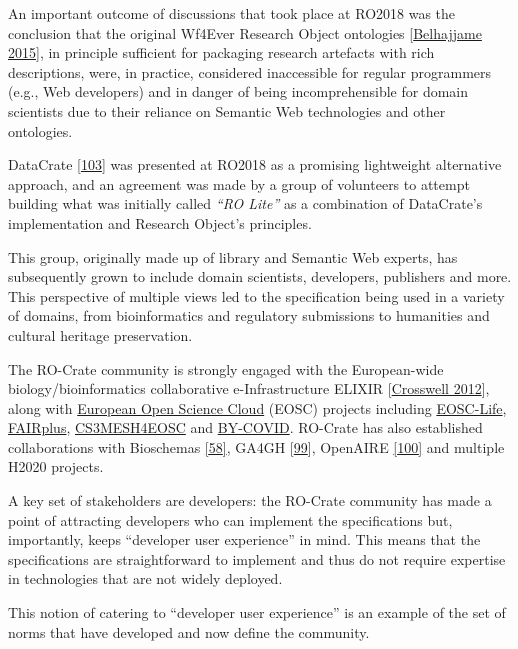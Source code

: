 An important outcome of discussions that took place at RO2018 was the
conclusion that the original Wf4Ever Research Object ontologies
{[}\href{https://doi.org/10.1016/j.websem.2015.01.003}{Belhajjame 2015}{]}, in
principle sufficient for packaging research artefacts with rich
descriptions, were, in practice, considered inaccessible for regular
programmers (e.g., Web developers) and in danger of being
incomprehensible for domain scientists due to their reliance on Semantic
Web technologies and other ontologies.

DataCrate {[}\href{https://doi.org/10.5281/zenodo.1445817}{103}{]} was
presented at RO2018 as a promising lightweight alternative approach, and
an agreement was made by a group of volunteers to attempt building what
was initially called \emph{``RO Lite''} as a combination of DataCrate's
implementation and Research Object's principles.

This group, originally made up of library and Semantic Web experts, has
subsequently grown to include domain scientists, developers, publishers
and more. This perspective of multiple views led to the specification
being used in a variety of domains, from bioinformatics and regulatory
submissions to humanities and cultural heritage preservation.

The RO-Crate community is strongly engaged with the European-wide
biology/bioinformatics collaborative e-Infrastructure ELIXIR
{[}\href{https://doi.org/10.1016/j.tibtech.2012.02.002}{Crosswell 2012}{]}, along
with \href{https://eosc.eu/}{European Open Science Cloud} (EOSC)
projects including \href{https://www.eosc-life.eu/}{EOSC-Life},
\href{https://fairplus-project.eu/}{FAIRplus},
\href{https://cs3mesh4eosc.eu/}{CS3MESH4EOSC} and
\href{https://by-covid.eu/}{BY-COVID}. RO-Crate has also established
collaborations with Bioschemas
\href{https://iswc2017.semanticweb.org/paper-579/}{{[}58{]}}, GA4GH
{[}\href{https://doi.org/10.1016/j.xgen.2021.100029}{99}{]}, OpenAIRE
\href{https://doi.org/10.5860/crln.76.6.9326}{{[}100{]}} and multiple
H2020 projects.

A key set of stakeholders are developers: the RO-Crate community has
made a point of attracting developers who can implement the
specifications but, importantly, keeps ``developer user experience'' in
mind. This means that the specifications are straightforward to
implement and thus do not require expertise in technologies that are not
widely deployed.

This notion of catering to ``developer user experience'' is an example
of the set of norms that have developed and now define the community.

